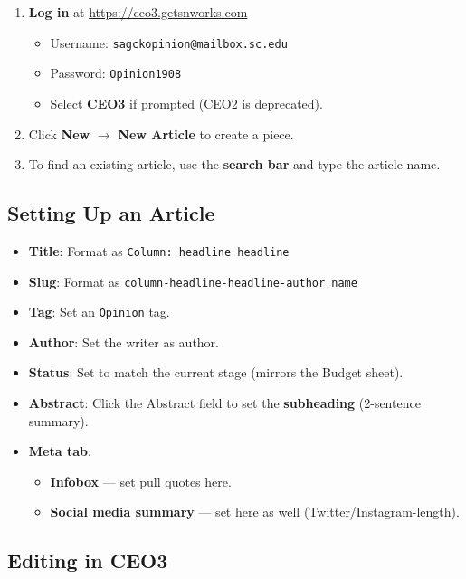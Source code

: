 \documentclass[12pt]{article}
\begin{document}
\begin{enumerate}
    \item \textbf{Log in} at \url{https://ceo3.getsnworks.com}
    \begin{itemize}
        \item Username: \texttt{sagckopinion@mailbox.sc.edu}
        \item Password: \texttt{Opinion1908}
        \item Select \textbf{CEO3} if prompted (CEO2 is deprecated).
    \end{itemize}
    \item Click \textbf{New} $\rightarrow$ \textbf{New Article} to create a piece.
    \item To find an existing article, use the \textbf{search bar} and type the article name.
\end{enumerate}

\subsection{Setting Up an Article}

\begin{itemize}
    \item \textbf{Title}: Format as \texttt{Column: headline headline}
    \item \textbf{Slug}: Format as \texttt{column-headline-headline-author\_name}
    \item \textbf{Tag}: Set an \texttt{Opinion} tag.
    \item \textbf{Author}: Set the writer as author.
    \item \textbf{Status}: Set to match the current stage (mirrors the Budget sheet).
    \item \textbf{Abstract}: Click the Abstract field to set the \textbf{subheading} (2-sentence summary).
    \item \textbf{Meta tab}:
    \begin{itemize}
        \item \textbf{Infobox} --- set pull quotes here.
        \item \textbf{Social media summary} --- set here as well (Twitter/Instagram-length).
    \end{itemize}
\end{itemize}

\subsection{Editing in CEO3}
\end{document}
